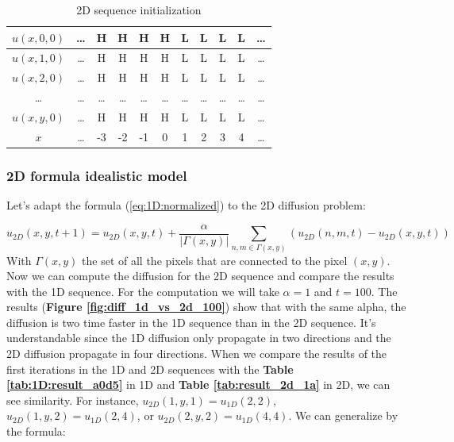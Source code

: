 \begin{table}[htb]
    \centering
    \begin{tabular}{|c|c|c|c|c|c||c|c|c|c|c|} \hline
        $u(x,0,0)$&\ldots&   H  &   H  &   H  &   H  &   L  &   L  &   L  &   L  &\ldots\\\hline
        $u(x,1,0)$&\ldots&   H  &   H  &   H  &   H  &   L  &   L  &   L  &   L  &\ldots\\\hline 
        $u(x,2,0)$&\ldots&   H  &   H  &   H  &   H  &   L  &   L  &   L  &   L  &\ldots\\\hline 
        \ldots    &\ldots&\ldots&\ldots&\ldots&\ldots&\ldots&\ldots&\ldots&\ldots&\ldots\\\hline 
        $u(x,y,0)$&\ldots&   H  &   H  &   H  &   H  &   L  &   L  &   L  &   L  & \ldots \\ \hline \hline
        $x$       &\ldots&  -3  &  -2  &  -1  &   0  &   1  &   2  &   3  &   4  & \ldots \\ \hline
    \end{tabular}
    \caption{2D sequence initialization}
    \label{tab:2D_init}
\end{table}

\subsubsection{2D formula idealistic model}

Let's adapt the formula (\ref{eq:1D:normalized}) to the 2D diffusion problem:

\begin{equation}
    u_{2D}(x,y,t+1) = u_{2D}(x,y,t) + \frac{\alpha}{|\Gamma(x,y)|} \sum_{n,m \in \Gamma(x,y)} \left(u_{2D}(n,m,t) - u_{2D}(x,y,t)\right)
    \label{eq:2Dnorm}
\end{equation}
%
With $\Gamma(x,y)$ the set of all the pixels that are connected to the pixel $(x,y)$. \\
%
Now we can compute the diffusion for the 2D sequence and compare the results with the 
1D sequence. For the computation we will take $\alpha = 1$ and $t = 100$. The results
(\textbf{Figure \ref{fig:diff_1d_vs_2d_100}}) show that with the same alpha, the diffusion
is two time faster in the 1D sequence than in the 2D sequence. It's understandable since
the 1D diffusion only propagate in two directions and the 2D diffusion propagate in four
directions. When we compare the results of the first iterations in the 1D and 2D sequences
with the \textbf{Table \ref{tab:1D:result_a0d5}} in 1D and \textbf{Table \ref{tab:result_2d_1a}} in 2D,
we can see similarity. For instance, $u_{2D}(1,y,1)=u_{1D}(2,2)$, $u_{2D}(1,y,2)=u_{1D}(2,4)$,
or $u_{2D}(2,y,2)=u_{1D}(4,4)$. We can generalize by the formula:

